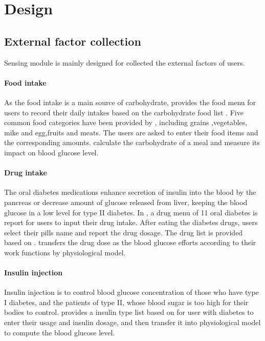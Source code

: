 
\section{Design}
\label{sec:design}

\subsection{External factor collection}
Sensing module is mainly designed for collected the external factors of users.

\paragraph{Food intake}
As the food intake is a main source of carbohydrate, \sysname provides the food menu for users to record their daily intakes based on the carbohydrate food list \cite{bib:carblist}.
Five common food categories have been provided by \sysname, including grains ,vegetables, mike and egg,fruits and meats. The users are asked to enter their food items and the corresponding amounts. \sysname calculate the carbohydrate of a meal and measure its impact on blood glucose level.

\paragraph{Drug intake}
The oral diabetes medications enhance secretion of insulin into the blood by the pancreas or decrease amount of glucose released from liver, keeping the blood glucose in a low level for type II diabetes.
In \sysname, a drug menu of 11 oral diabetes is report for users to input their drug intake. After eating the diabetes drugs, users select their pills name and report the drug dosage. The drug list is provided based on \cite{bib:druglist}.
\sysname transfers the drug dose as the blood glucose efforts according to their work functions \cite{bib:druglist, bib:bolen2007systematic, bib:bennett2011oral}  by physiological model.

\paragraph{Insulin injection}
Insulin injection is to control blood glucose concentration of those who have type I diabetes, and the patients of type II, whose blood sugar is too high for their bodies to control. \sysname provides a insulin type list based on \cite{bib:insulinlist} for user with diabetes to enter their usage and insulin dosage, and then transfer it into physiological model to compute the blood glucose level.

